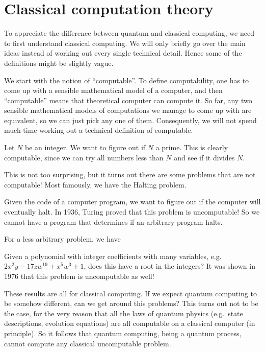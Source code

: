 \section{Classical computation theory}
To appreciate the difference between quantum and classical computing, we need to first understand classical computing. We will only briefly go over the main ideas instead of working out every single technical detail. Hence some of the definitions might be slightly vague.

We start with the notion of ``computable''. To define computability, one has to come up with a sensible mathematical model of a computer, and then ``computable'' means that theoretical computer can compute it. So far, any two sensible mathematical models of computations we manage to come up with are equivalent, so we can just pick any one of them. Consequently, we will not spend much time working out a technical definition of computable.

\begin{eg}
  Let $N$ be an integer. We want to figure out if $N$ a prime. This is clearly computable, since we can try all numbers less than $N$ and see if it divides $N$.
\end{eg}

This is not too surprising, but it turns out there are some problems that are not computable! Most famously, we have the Halting problem.
\begin{eg}
  Given the code of a computer program, we want to figure out if the computer will eventually halt. In 1936, Turing proved that this problem is uncomputable! So we cannot have a program that determines if an arbitrary program halts.
\end{eg}

For a less arbitrary problem, we have
\begin{eg}
  Given a polynomial with integer coefficients with many variables, e.g.\ $2x^2 y - 17 zw^{19} + x^5 w^3 + 1$, does this have a root in the integers? It was shown in 1976 that this problem is uncomputable as well!
\end{eg}

These results are all for classical computing. If we expect quantum computing to be somehow different, can we get around this problems? This turns out not to be the case, for the very reason that all the laws of quantum physics (e.g.\ state descriptions, evolution equations) are all computable on a classical computer (in principle). So it follows that quantum computing, being a quantum process, cannot compute any classical uncomputable problem.

